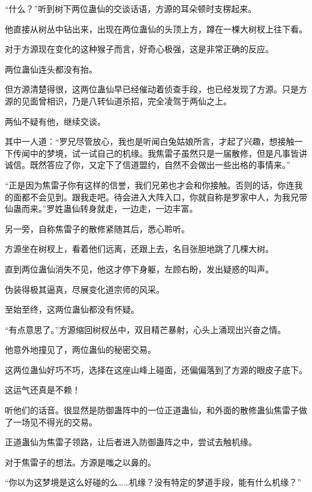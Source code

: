 
\begin{this_body}

“什么？”听到树下两位蛊仙的交谈话语，方源的耳朵顿时支楞起来。

他直接从树丛中钻出来，出现在两位蛊仙的头顶上方，蹲在一棵大树杈上往下看。

对于方源现在变化的这种猴子而言，好奇心极强，这是非常正确的反应。

两位蛊仙连头都没有抬。

但方源清楚得很，这两位蛊仙早已经催动着侦查手段，也已经发现了方源。只是方源的见面曾相识，乃是八转仙道杀招，完全凌驾于两仙之上。

两仙不疑有他，继续交谈。

其中一人道：“罗兄尽管放心，我也是听闻白兔姑娘所言，才起了兴趣，想接触一下传闻中的梦境，试一试自己的机缘。我焦雷子虽然只是一届散修，但是凡事皆讲诚信。既然答应了你，又定下了信道盟约，自然不会做出一些出格的事情来。”

“正是因为焦雷子你有这样的信誉，我们兄弟也才会和你接触。否则的话，你连我的面都不会见到。跟我走吧。待会进入大阵入口，你就自称是罗家中人，为我兄带仙蛊而来。”罗姓蛊仙转身就走，一边走，一边丰富。

另一旁，自称焦雷子的散修紧随其后，悉心聆听。

方源坐在树杈上，看着他们远离，还跟上去，名目张胆地跳了几棵大树。

直到两位蛊仙消失不见，他这才停下身躯，左顾右盼，发出疑惑的叫声。

伪装得极其逼真，尽展变化道宗师的风采。

至始至终，这两位蛊仙都没有怀疑。

“有点意思了。”方源缩回树杈丛中，双目精芒暴射，心头上涌现出兴奋之情。

他意外地撞见了，两位蛊仙的秘密交易。

这两位蛊仙好巧不巧，选择在这座山峰上碰面，还偏偏落到了方源的眼皮子底下。

这运气还真是不赖！

听他们的话音。很显然是防御蛊阵中的一位正道蛊仙，和外面的散修蛊仙焦雷子做了一场见不得光的交易。

正道蛊仙为焦雷子领路，让后者进入防御蛊阵之中，尝试去触机缘。

对于焦雷子的想法。方源是嗤之以鼻的。

“你以为这梦境是这么好碰的么……机缘？没有特定的梦道手段，能有什么机缘？”


\end{this_body}
